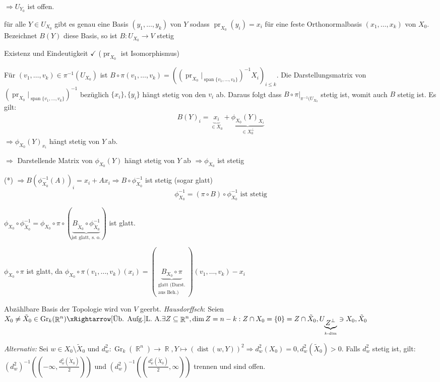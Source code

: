 \documentclass[paper=A4, twoside, chapterprefix=true, bibliography=totoc, headsepline]{scrbook}
\let\temp\phi{}
\let\phi\varphi{}
\let\varphi\temp{}
\let\temp\theta{}
\let\theta\vartheta{}
\let\vartheta\temp{}
\let\temp\epsilon{}
\let\epsilon\varepsilon{}
\let\varepsilon\temp{}
\let\temp\rho{}
\let\rho\varrho{}
\let\varrho\temp{}
\DeclareMathOperator{\R}{\mathbb{R}}
\DeclareMathOperator{\dist}{dist}   %
\DeclareMathOperator{\mspan}{span}  %
\DeclareMathOperator{\pr}{pr}
\DeclareMathOperator{\Gr}{Gr}
\theoremstyle{plain}
\theoremstyle{nonumberplain}
\theoremstyle{empty}
\theoremstyle{break}
\begin{document}
$\Rightarrow U_{Y_0}$ ist offen.
\begin{description}[font=\normalfont\bfseries]
\item[zu 2)]\begin{description}[font=\normalfont\itshape]
	\item[Behauptung:] f\"ur alle $Y \in U_{X_0}$ gibt es genau eine Basis $(y_1,\ldots ,y_k)$ von $Y$ sodass $\pr_{X_0}(y_i) = x_i$ f\"ur eine feste Orthonormalbasis $(x_1,\ldots ,x_k)$ von $X_0$. Bezeichnet $B(Y)$ diese Basis, so ist $B: U_{X_0} \to V$ stetig
	\item[Beweis:] Existenz und Eindeutigkeit $\checkmark$ ($\pr_{X_0}$ ist Isomorphismus)
		
		F\"ur $(v_1,\ldots ,v_k) \in \pi^{-1}(U_{X_0})$ ist $B \circ \pi(v_1,\ldots ,v_k) = ((\pr_{X_0}|_{\mspan\{v_1,\ldots ,v_k\}})^{-1} X_i)_{i \le k}$. Die Darstellungsmatrix von $(\pr_{X_0}|_{\mspan\{v_1,\ldots ,v_k\}})^{-1}$ bez\"uglich $\{x_i\}, \{y_i\}$ h\"angt stetig von den $v_i$ ab. Daraus folgt dass $B \circ \pi|_{\pi^{-1}(U_{X_0}}$ stetig ist, womit auch $B$ stetig ist. Es gilt:
		\begin{align*}
			B(Y)_i = \underbrace{x_i}_{\in X_0} + \underbrace{\varphi_{X_0}(Y)_{X_i}}_{\in X_0^\perp} \tag{*}
		\end{align*}
		$\Rightarrow \varphi_{X_0}(Y)_{x_i}$ h\"angt stetig von $Y$ ab.
		
		$\Rightarrow$ Darstellende Matrix von $\varphi_{X_0}(Y)$ h\"angt stetig von $Y$ ab $\Rightarrow \varphi_{X_0}$ ist stetig
		
		(*) $\Rightarrow B(\varphi_{X_0}^{-1}(A))_i = x_i + Ax_i \Rightarrow B \circ \varphi_{X_0}^{-1}$ ist stetig (sogar glatt)
			\[ \varphi_{X_0}^{-1} = (\pi \circ B) \circ \varphi_{X_0}^{-1} \text{ ist stetig} \]
	\end{description}
\item[zu 3)]
	$\varphi_{X_0} \circ \varphi_{\tilde X_0}^{-1} = \varphi_{X_0} \circ \pi \circ (\underbrace{B_{\tilde X_0} \circ \varphi_{\tilde X_0}^{-1}}_{\text{ist glatt, s. o.}})$ ist glatt.
	
	$\varphi_{X_0} \circ \pi$ ist glatt, da $\varphi_{X_0} \circ \pi(v_1,\ldots ,v_k)(x_i) = (\underbrace{B_{X_0} \circ \pi}_{\substack{\text{glatt (Darst.}\\ \text{aus Beh.)}}})(v_1,\ldots ,v_k) - x_i$
\item[zu 4)]
	Abz\"ahlbare Basis der Topologie wird von $V$ geerbt. \emph{Hausdorffsch}: Seien $X_0 \ne \tilde X_0 \in \Gr_k(\R^n) \xRightarrow[\text{\"Ub. Aufg.}]{\text{L. A.}} \exists Z \subseteq \R^n, \dim Z = n-k: Z \cap X_0 = \{0\} = Z \cap \tilde X_0, U_{\underbrace{Z^\perp}_{k\text{-dim}}} \ni X_0, \tilde X_0$
	
	\emph{Alternativ:} Sei $w \in X_0 \setminus \tilde X_0$ und $d_w^2: \Gr_k(\R^n) \to \R, Y \mapsto (\dist(w, Y))^2 \Rightarrow d_w^2(X_0) = 0, d_w^2(\tilde X_0) > 0$. Falls $d_w^2$ stetig ist, gilt: $(d_w^2)^{-1}((-\infty, \frac{d_w^2(\tilde X_0)}{2}))$ und $(d_w^2)^{-1}((\frac{d_w^2(\tilde X_0)}{2}, \infty))$ trennen und sind offen.
\end{description}
\end{document}
